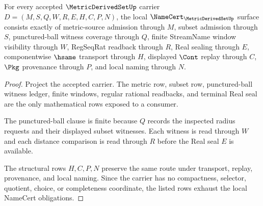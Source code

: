\begin{theorem}
\label{thm:metric-derived-set-namecert-obligations}
For every accepted $\MetricDerivedSetUp$ carrier $D=(M,S,Q,W,R,E,H,C,P,N)$, the local $\NameCert_{\MetricDerivedSetUp}$ surface consists exactly of metric-source admission through $M$, subset admission through $S$, punctured-ball witness coverage through $Q$, finite StreamName window visibility through $W$, RegSeqRat readback through $R$, Real sealing through $E$, componentwise $\hsame$ transport through $H$, displayed $\Cont$ replay through $C$, $\Pkg$ provenance through $P$, and local naming through $N$.
\end{theorem}
\begin{proof}
Project the accepted carrier. The metric row, subset row, punctured-ball witness ledger, finite windows, regular rational readbacks, and terminal Real seal are the only mathematical rows exposed to a consumer.

The punctured-ball clause is finite because $Q$ records the inspected radius requests and their displayed subset witnesses. Each witness is read through $W$ and each distance comparison is read through $R$ before the Real seal $E$ is available.

The structural rows $H,C,P,N$ preserve the same route under transport, replay, provenance, and local naming. Since the carrier has no compactness, selector, quotient, choice, or completeness coordinate, the listed rows exhaust the local NameCert obligations.
\end{proof}

